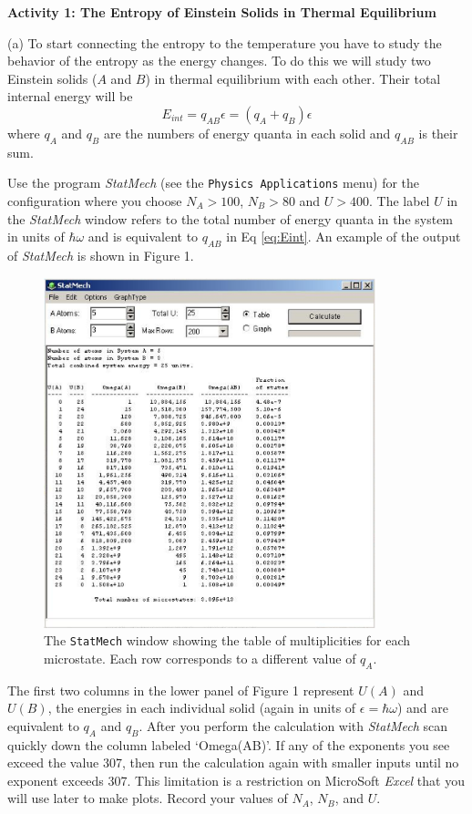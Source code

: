 \textbf{Activity 1: The Entropy of Einstein Solids in Thermal Equilibrium}

(a) To start connecting the entropy to the temperature you have to study the 
behavior of the entropy as the energy changes.
To do this we will study two Einstein solids ($A$ and $B$) in thermal equilibrium with 
each other.
Their total internal energy will be
\begin{equation}\label{eq:Eint}
E_{int} = q_{AB}\epsilon = (q_A + q_B) \epsilon
\end{equation}
where $q_A$ and $q_B$ are the numbers of energy quanta in each solid and $q_{AB}$ is 
their sum.

Use the program {\it StatMech} (see the {\tt Physics Applications} menu)
for the configuration where you choose $N_A > 100$, $N_B > 80$ and $U>400$.
The label $U$ in the {\it StatMech} window refers to the total number of energy quanta 
in the system
in units of $\hbar \omega$ and is equivalent to $q_{AB}$  in Eq \ref{eq:Eint}.
An example of the output of {\it StatMech} is shown in Figure 1.
\begin{figure}[ht!]
\begin{center}
\includegraphics[height=4.0in]{entropy_temperature/statmech1.eps}
\caption{The {\tt StatMech} window showing the table of multiplicities for each microstate.
Each row corresponds to a different value of $q_A$.}
\end{center}
\end{figure}
The first two columns in the lower panel of Figure 1 represent $U(A)$ and $U(B)$, 
the energies in each 
individual solid (again in units of $\epsilon = \hbar \omega$) and are equivalent to $q_A$ and $q_B$.
After you perform the calculation with {\it StatMech} scan quickly down the column
labeled `Omega(AB)'.
If any of the exponents you see exceed the value 307, then run the calculation again with 
smaller inputs until no exponent exceeds 307.
This limitation is a restriction on MicroSoft {\it Excel} that you will use later to make
plots.
Record your values of $N_A$, $N_B$, and $U$.
\vspace{15mm}

